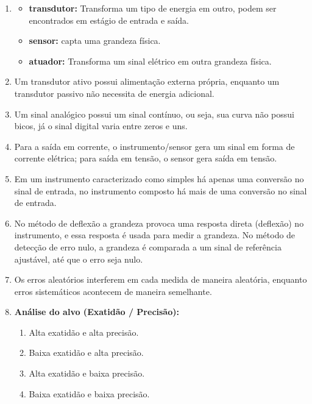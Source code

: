 \begin{enumerate}[label=\textbf{\arabic*)}, leftmargin=*]

    \item 
    \begin{itemize}
        \item \textbf{transdutor:} Transforma um tipo de energia em outro, podem ser encontrados em estágio de entrada e saída.
        \item \textbf{sensor:} capta uma grandeza física.
        \item \textbf{atuador:} Transforma um sinal elétrico em outra grandeza física.
    \end{itemize}

    \item Um transdutor ativo possui alimentação externa própria, enquanto um transdutor passivo não necessita de energia adicional.

    \item Um sinal analógico possui um sinal contínuo, ou seja, sua curva não possui bicos, já o sinal digital varia entre zeros e uns.

    \item Para a saída em corrente, o instrumento/sensor gera um sinal em forma de corrente elétrica; para saída em tensão, o sensor gera saída em tensão.

    \item Em um instrumento caracterizado como simples há apenas uma conversão no sinal de entrada, no instrumento composto há mais de uma conversão no sinal de entrada.

    \item No método de deflexão a grandeza provoca uma resposta direta (deflexão) no instrumento, e essa resposta é usada para medir a grandeza. No método de detecção de erro nulo, a grandeza é comparada a um sinal de referência ajustável, até que o erro seja nulo.

    \item Os erros aleatórios interferem em cada medida de maneira aleatória, enquanto erros sistemáticos acontecem de maneira semelhante.
    \item \textbf{Análise do alvo (Exatidão / Precisão):}
    \begin{enumerate}[label=\alph*)]
        \item Alta exatidão e alta precisão.
        \item Baixa exatidão e alta precisão.
        \item Alta exatidão e baixa precisão.
        \item Baixa exatidão e baixa precisão.
    \end{enumerate}


\end{enumerate}
